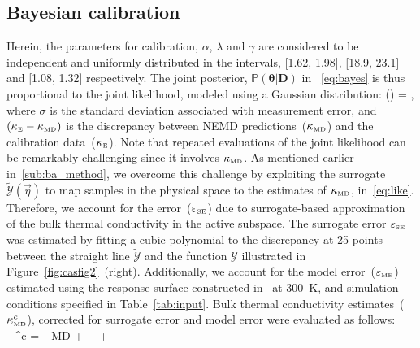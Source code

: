 \subsection{Bayesian calibration}
\label{sub:ba}

Herein, the parameters for calibration, $\alpha$, $\lambda$ and $\gamma$ are considered to be independent and
uniformly distributed in the intervals, [1.62, 1.98], [18.9, 23.1] and [1.08, 1.32] respectively.
The joint posterior, $\mathbb{P}(\bm{\theta}\vert \bm{D})$ in ~\eqref{eq:bayes} is thus 
proportional to the joint likelihood, modeled using a Gaussian distribution:
%
\be
{}(\vert\bm{\theta}) = \exp{},
\label{eq:like}
\ee
%
\noindent where $\sigma$ is the standard deviation associated with measurement error, and
$(\kappa_{\tiny{\mbox{E}}} - \kappa_{\tiny{\mbox{MD}}})$ is the discrepancy between 
NEMD predictions~($\kappa_{\tiny{\mbox{MD}}}$) and the calibration data~($\kappa_{\tiny{\mbox{E}}}$). 
Note that repeated evaluations of the joint likelihood can be remarkably challenging since it involves 
$\kappa_{\tiny{\mbox{MD}}}$. As mentioned earlier in~\ref{sub:ba_method}, we overcome this challenge by
exploiting the surrogate
$\tilde{\mathcal{Y}}(\vec{\eta})$ to map samples in the physical space to the estimates of 
$\kappa_{\tiny{\mbox{MD}}}$, in~\eqref{eq:like}. Therefore, we account for the error~($\varepsilon_\text{\tiny{SE}}$)
due to surrogate-based approximation of the bulk thermal conductivity in the active subspace. 
The surrogate error $\varepsilon_\text{\tiny{SE}}$ was estimated by fitting a cubic polynomial to the
discrepancy at 25 points between the straight line $\tilde{\mathcal{Y}}$ and the function $\mathcal{Y}$
illustrated in Figure~\ref{fig:casfig2}~(right). Additionally, we account for the 
model error~($\varepsilon_\text{\tiny{ME}}$) estimated using the response surface constructed in~\cite{Vohra:2018a} at 
300~K, and simulation conditions specified in Table~\ref{tab:input}. Bulk thermal conductivity 
estimates~($\kappa_\text{\tiny{MD}}^{c}$), corrected for surrogate error and model error were evaluated as follows:
%
\be
\kappa_^{c} = \kappa_{\tiny{\mbox{MD}}} + \varepsilon_ + \varepsilon_
\ee
%

